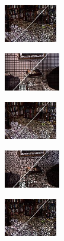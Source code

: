 \begin{figure}
\begin{subfigure}[b]{0.1375\textwidth}
    \end{subfigure}
    \begin{subfigure}[b]{0.129\textwidth}
        \includegraphics[height=1.65cm]{pictures/sunrgbd/ergc/cropped/ergc_00007477_contours}
    \end{subfigure}
    \begin{subfigure}[b]{0.02\textwidth}
    \end{subfigure}
    \begin{subfigure}[b]{0.1375\textwidth}
        \includegraphics[height=1.65cm]{pictures/nyuv2/mss/cropped/mss_00001297_contours}
    \end{subfigure}
    \begin{subfigure}[b]{0.129\textwidth}
        \includegraphics[height=1.65cm]{pictures/sunrgbd/mss/cropped/mss_00007477_contours}
    \end{subfigure}
    \begin{subfigure}[b]{0.02\textwidth}
    \end{subfigure}
    \begin{subfigure}[b]{0.1375\textwidth}
        \includegraphics[height=1.65cm]{pictures/nyuv2/preslic/cropped/preslic_00001297_contours}
    \end{subfigure}
    \begin{subfigure}[b]{0.129\textwidth}
        \includegraphics[height=1.65cm]{pictures/sunrgbd/preslic/cropped/preslic_00007477_contours}

\end{subfigure}
\end{figure}
